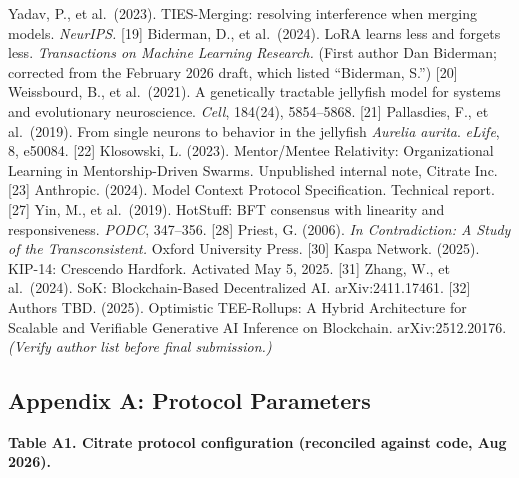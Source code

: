 Yadav, P., et al.~(2023). TIES-Merging: resolving interference when
merging models. \emph{NeurIPS.} {[}19{]} Biderman, D., et al.~(2024).
LoRA learns less and forgets less. \emph{Transactions on Machine
Learning Research.} (First author Dan Biderman; corrected from the
February 2026 draft, which listed ``Biderman, S.'') {[}20{]} Weissbourd,
B., et al.~(2021). A genetically tractable jellyfish model for systems
and evolutionary neuroscience. \emph{Cell}, 184(24), 5854--5868.
{[}21{]} Pallasdies, F., et al.~(2019). From single neurons to behavior
in the jellyfish \emph{Aurelia aurita}. \emph{eLife}, 8, e50084.
{[}22{]} Klosowski, L. (2023). Mentor/Mentee Relativity: Organizational
Learning in Mentorship-Driven Swarms. Unpublished internal note, Citrate
Inc. {[}23{]} Anthropic. (2024). Model Context Protocol Specification.
Technical report. {[}27{]} Yin, M., et al.~(2019). HotStuff: BFT
consensus with linearity and responsiveness. \emph{PODC}, 347--356.
{[}28{]} Priest, G. (2006). \emph{In Contradiction: A Study of the
Transconsistent.} Oxford University Press. {[}30{]} Kaspa Network.
(2025). KIP-14: Crescendo Hardfork. Activated May 5, 2025. {[}31{]}
Zhang, W., et al.~(2024). SoK: Blockchain-Based Decentralized AI.
arXiv:2411.17461. {[}32{]} Authors TBD. (2025). Optimistic TEE-Rollups:
A Hybrid Architecture for Scalable and Verifiable Generative AI
Inference on Blockchain. arXiv:2512.20176. \emph{(Verify author list
before final submission.)}

\subsection{Appendix A: Protocol
Parameters}\label{appendix-a-protocol-parameters}

\textbf{Table A1. Citrate protocol configuration (reconciled against
code, Aug 2026).}

